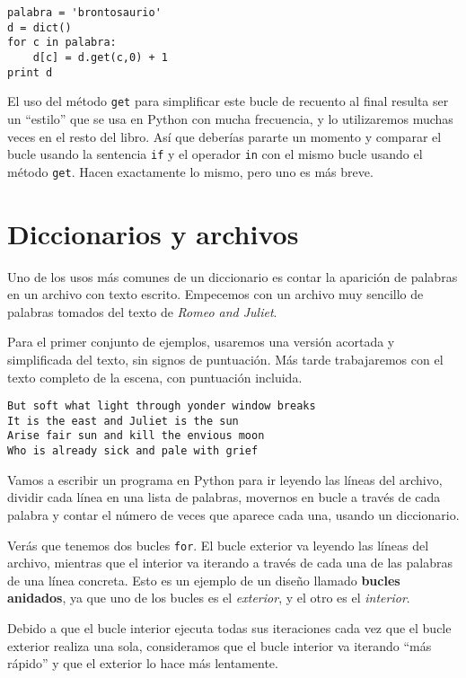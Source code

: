 \beforeverb
\begin{verbatim}
palabra = 'brontosaurio'
d = dict()
for c in palabra:
    d[c] = d.get(c,0) + 1
print d
\end{verbatim}
\afterverb
%
El uso del método {\tt get} para simplificar este bucle de recuento
al final resulta ser un ``estilo'' que se usa en Python con mucha frecuencia, y
lo utilizaremos muchas veces en el resto del libro. Así que deberías
pararte un momento y comparar el bucle usando la sentencia {\tt if}
y el operador {\tt in} con el mismo bucle usando el método {\tt get}.
Hacen exactamente lo mismo, pero uno es más breve.

\section{Diccionarios y archivos}

Uno de los usos más comunes de un diccionario es contar la aparición
de palabras en un archivo con texto escrito.
Empecemos con un archivo muy sencillo de
palabras tomados del texto de \emph{Romeo and Juliet}.

Para el primer conjunto de ejemplos, usaremos una versión acortada y simplificada
del texto, sin signos de puntuación. Más tarde trabajaremos con el texto completo
de la escena, con puntuación incluida.

\beforeverb
\begin{verbatim}
But soft what light through yonder window breaks
It is the east and Juliet is the sun
Arise fair sun and kill the envious moon
Who is already sick and pale with grief
\end{verbatim}
\afterverb
%
Vamos a escribir un programa en Python para ir leyendo las líneas del archivo,
dividir cada línea en una lista de palabras, movernos en bucle a través de cada
palabra y contar el número de veces que aparece cada una, usando un diccionario.

Verás que tenemos dos bucles {\tt for}. El bucle exterior va leyendo las
líneas del archivo, mientras que el interior va iterando a través de cada
una de las palabras de una línea concreta. Esto es un ejemplo
de un diseño llamado {\bf bucles anidados}, ya que uno de los bucles
es el \emph{exterior}, y el otro es el \emph{interior}.

Debido a que el bucle interior ejecuta todas sus iteraciones cada vez
que el bucle exterior realiza una sola, consideramos
que el bucle interior va iterando ``más rápido'' y que el exterior lo hace
más lentamente.

